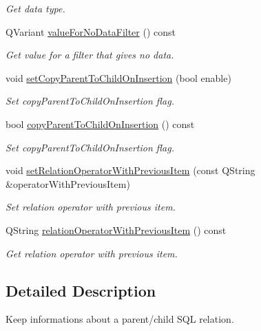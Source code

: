 \begin{DoxyCompactItemize}
\begin{DoxyCompactList}\small\item\em Get data type. \end{DoxyCompactList}\item 
Q\-Variant \hyperlink{classmdt_sql_relation_item_a3d2e24b35c88b246dac2a825019f037b}{value\-For\-No\-Data\-Filter} () const 
\begin{DoxyCompactList}\small\item\em Get value for a filter that gives no data. \end{DoxyCompactList}\item 
void \hyperlink{classmdt_sql_relation_item_aa9826f0e86d7ba7acf046012bbf8a38f}{set\-Copy\-Parent\-To\-Child\-On\-Insertion} (bool enable)
\begin{DoxyCompactList}\small\item\em Set copy\-Parent\-To\-Child\-On\-Insertion flag. \end{DoxyCompactList}\item 
bool \hyperlink{classmdt_sql_relation_item_a959affdf96c2d4882028270f9ae7cf00}{copy\-Parent\-To\-Child\-On\-Insertion} () const 
\begin{DoxyCompactList}\small\item\em Set copy\-Parent\-To\-Child\-On\-Insertion flag. \end{DoxyCompactList}\item 
void \hyperlink{classmdt_sql_relation_item_a00fd905a9b9e7d3f33ac73df0f1e8901}{set\-Relation\-Operator\-With\-Previous\-Item} (const Q\-String \&operator\-With\-Previous\-Item)
\begin{DoxyCompactList}\small\item\em Set relation operator with previous item. \end{DoxyCompactList}\item 
Q\-String \hyperlink{classmdt_sql_relation_item_aad30a0f5b83e6efb0c43d87648369c11}{relation\-Operator\-With\-Previous\-Item} () const 
\begin{DoxyCompactList}\small\item\em Get relation operator with previous item. \end{DoxyCompactList}\end{DoxyCompactItemize}


\subsection{Detailed Description}
Keep informations about a parent/child S\-Q\-L relation. 

